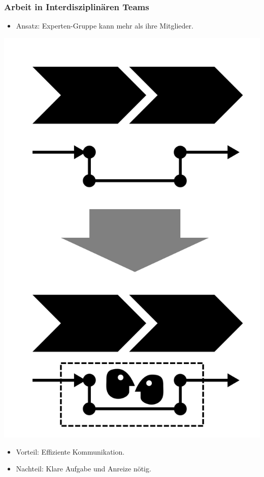 \documentclass{beamer}
\begin{document}
 \begin{frame}
  \frametitle{Arbeit in Interdisziplinären Teams}
  \begin{itemize}
    \item Ansatz: Experten-Gruppe kann mehr als ihre Mitglieder.
  \end{itemize}
  \centerline{\includegraphics[scale=2.5]{4_6_9.png}}
  \begin{itemize}
    \item Vorteil: Effiziente Kommunikation.
    \item Nachteil: Klare Aufgabe und Anreize nötig.
  \end{itemize}
 \end{frame}
\end{document}
